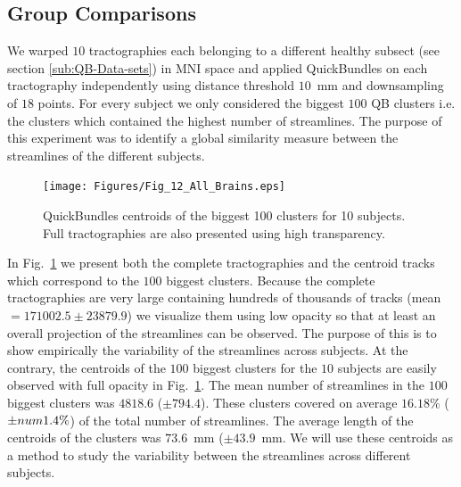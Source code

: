 \documentclass{bioinfo}
\begin{document}


\subsection{Group Comparisons \label{sub:group_comp}}

We warped $10$ tractographies each belonging to a different healthy
subsect (see section \ref{sub:QB-Data-sets}) in MNI space and applied
QuickBundles on each tractography independently using distance threshold
$10$~mm and downsampling of $18$ points. For every subject we
only considered the biggest $100$ QB clusters i.e. the clusters which
contained the highest number of streamlines. The purpose of this
experiment was to identify a global similarity measure between the
streamlines of the different subjects.

\begin{figure}[htp]
\centerline{\texttt{[image: Figures/Fig\_12\_All\_Brains.eps]}}
\caption{QuickBundles centroids of the biggest 100 clusters for 10
  subjects. Full tractographies are also presented using high
  transparency. \label{Flo:BAs}}
\end{figure}

In Fig.~\ref{Flo:BAs} we present both the complete tractographies and
the centroid tracks which correspond to the $100$ biggest
clusters. Because the complete tractographies are very large containing
hundreds of thousands of tracks (mean$=\num{171002.5}\pm\num{23879.9}$)
we visualize them using low opacity so that at least an overall
projection of the streamlines can be observed. The purpose of this is to
show empirically the variability of the streamlines across subjects. At
the contrary, the centroids of the $100$ biggest clusters for the $10$
subjects are easily observed with full opacity in
Fig.~\ref{Flo:BAs}. The mean number of streamlines in the $100$ biggest
clusters was $\num{4818.6}$ ($\pm \num{794.4}$). These clusters covered
on average $16.18\%$ ($\pm\\num{1.4}\%$) of the total number of
streamlines. The average length of the centroids of the clusters was
$73.6$~mm ($\pm\num{43.9}$~mm. We will use these centroids as a method
to study the variability between the streamlines across different
subjects.
\end{document}
